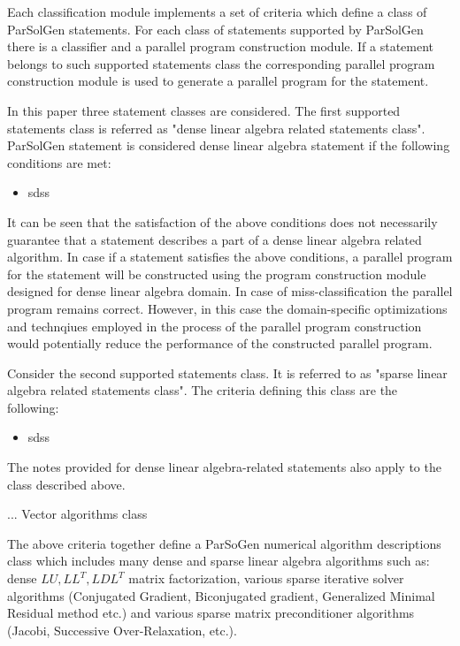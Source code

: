 \documentclass[conference]{IEEEtran}
\begin{document}
Each classification module implements a set of criteria which define a class of ParSolGen statements. 
For each class of statements supported by ParSolGen there is a classifier and a parallel program construction 
module. If a statement belongs to such supported statements class the corresponding parallel 
program construction module is used to generate a parallel program for the statement.

In this paper three statement classes are considered. The first supported statements class is 
referred as "dense linear algebra related statements class". ParSolGen statement is considered dense linear 
algebra statement if the following conditions are met:
\begin{itemize}
	\item sdss
\end{itemize}

It can be seen that the satisfaction of the above conditions does not necessarily guarantee 
that a statement describes a part of a dense linear algebra related algorithm. In case if a 
statement satisfies the above conditions, a parallel program for the statement will be constructed 
using the program construction module designed for dense linear algebra domain. 
In case of miss-classification the parallel program remains correct. However, in this case 
the domain-specific optimizations and technqiues employed in the process of the parallel 
program construction would potentially reduce the performance of the constructed parallel 
program. 

Consider the second supported statements class. It is referred to as "sparse linear algebra related statements class". 
The criteria defining this class are the following:
\begin{itemize}
	\item sdss
\end{itemize}
The notes provided for dense linear algebra-related statements also apply to the class described above. 

...
Vector algorithms class

The above criteria together define a ParSoGen numerical algorithm descriptions class which includes 
many dense and sparse linear algebra algorithms such as: dense \(LU, LL^T, LDL^T\) matrix factorization, various sparse iterative solver algorithms (Conjugated Gradient, Biconjugated gradient, Generalized Minimal Residual method etc.) and various sparse matrix preconditioner algorithms (Jacobi, Successive Over-Relaxation, etc.).
\end{document}

